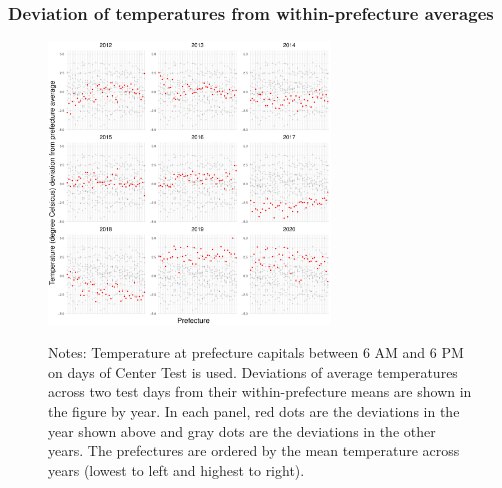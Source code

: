 \documentclass[9pt, pdfmx,hiresbb]{beamer}
\begin{document}
\begin{frame}\frametitle{Deviation of temperatures from within-prefecture averages}
  \begin{center}
    \begin{figure}
      \includegraphics[width=7.5cm]{../Output/images/temperature_diff_by_year.pdf}
      \tiny
      \begin{tablenotes}
      \item Notes:
        Temperature at prefecture capitals between 6 AM and 6 PM on days of Center Test is used.
        Deviations of average temperatures across two test days from their within-prefecture means are shown in the figure by year.
        In each panel, red dots are the deviations in the year shown above and gray dots are the deviations in the other years.
        The prefectures are ordered by the mean temperature across years (lowest to left and highest to right).
      \end{tablenotes}
    \end{figure}
  \end{center}
\end{frame}
\end{document}

